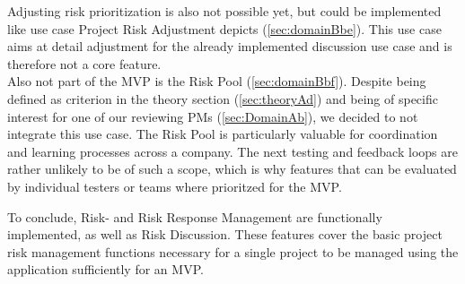  Adjusting risk prioritization is also not possible yet, but could be implemented like use case Project Risk Adjustment depicts (\ref{sec:domainBbe}). This use case aims at detail adjustment for the already implemented discussion use case and is therefore not a core feature.\\
 Also not part of the MVP is the Risk Pool (\ref{sec:domainBbf}). Despite being defined as criterion in the theory section (\ref{sec:theoryAd}) and being of specific interest for one of our reviewing PMs  (\ref{sec:DomainAb}), we decided to not integrate this use case. The Risk Pool is particularly valuable for coordination and learning processes across a company. The next testing and feedback loops are rather unlikely to be of such a scope, which is why features that can be evaluated by individual testers or teams where prioritzed for the \ac{MVP}.

 
 To conclude, Risk- and Risk Response Management are functionally implemented, as well as Risk Discussion. These features cover the basic project risk management functions necessary for a single project to be managed using the application sufficiently for an \ac{MVP}.
 